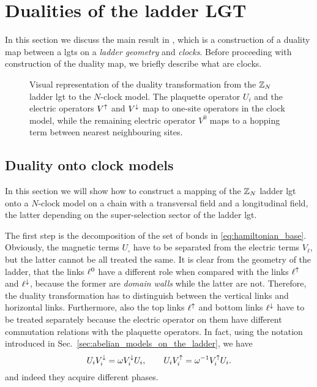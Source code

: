 \section{Dualities of the ladder LGT}%
\label{sec:dualities_of_the_ladder}

In this section we discuss the main result in \cite{pradhan2022ladder}, which is a construction of a duality map between a \acfp{lgt} on a \emph{ladder geometry} and \emph{\acp{clock}}.
Before proceeding with construction of the duality map, we briefly describe what are \acp{clock}.

%
%



\begin{figure}[t]
    \centering
    
    \caption[Duality map of $\Z_N$ ladder \ac{lgt}]{Visual representation of the duality transformation from the $\Z_N$ ladder \ac{lgt} to the $N$-clock model.
    The plaquette operator $U_i$ and the electric operators $V^{\uparrow}$ and $V^{\downarrow}$ map to one-site operators in the clock model, while
    the remaining electric operator $V^0$ maps to a hopping term between nearest neighbouring sites.}
    \label{fig:ladder_duality}
\end{figure}

\subsection{Duality onto clock models}
\label{sub:duality_onto_clock_models}


In this section we will show how to construct a mapping of the $\Z_N$ ladder \ac{lgt} onto a $N$-clock model on a chain with a transversal field and a longitudinal field, the latter depending on the super-selection sector of the ladder \ac{lgt}.

The first step is the decomposition of the set of bonds in \eqref{eq:hamiltonian_base}.
Obviously, the magnetic terms $U_{\square}$ have to be separated from the electric terms $V_\ell$, but the latter cannot be all treated the same.
It is clear from the geometry of the ladder, that the links $\ell^0$ have a different role when compared with the links $\ell^\uparrow$ and $\ell^\downarrow$, because the former are \emph{domain walls} while the latter are not.
Therefore, the duality transformation has to distinguish between the vertical links and horizontal links.
Furthermore, also the top links $\ell^\uparrow$ and bottom links $\ell^\downarrow$ have to be treated separately because the electric operator on them have different commutation relations with the plaquette operators.
In fact, using the notation introduced in Sec.~\ref{sec:abelian_models_on_the_ladder}, we have
\begin{equation}
    U_i V^{\downarrow}_i = \omega V^{\downarrow}_i U_i, \qquad
    U_i V^{\uparrow}_i = \omega^{-1} V^{\uparrow}_i U_i.
    \label{eq:comm_rel_ladder}
\end{equation}
and indeed they acquire different phases.

